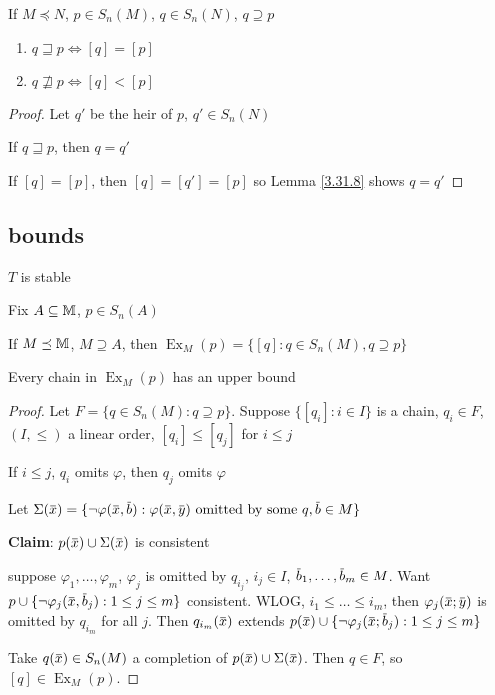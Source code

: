 \documentclass[11pt]{article}
\DeclareMathOperator{\Ex}{Ex}
\begin{document}
\begin{proposition}[]
\label{3.31.9}
If \(M\preceq N\), \(p\in S_n(M)\), \(q\in S_n(N)\), \(q\supseteq p\)
\begin{enumerate}
\item \(q\sqsupseteq p\Leftrightarrow[q]=[p]\)
\item \(q\not\sqsupseteq p\Leftrightarrow[q]<[p]\)
\end{enumerate}
\end{proposition}

\begin{proof}
Let \(q'\) be the heir of \(p\), \(q'\in S_n(N)\)

If \(q\sqsupseteq p\), then \(q=q'\)

If \([q]=[p]\), then \([q]=[q']=[p]\) so Lemma \ref{3.31.8} shows \(q=q'\)
\end{proof}
\subsection{bounds}
\label{sec:orgdd4dde4}
\(T\) is stable

Fix \(A\subseteq\mathbb{M}\), \(p\in S_n(A)\)

\begin{definition}[]
If \(M\preceq\mathbb{M}\), \(M\supseteq A\), then \(\Ex_M(p)=\{[q]:q\in S_n(M), q\supseteq p\}\)
\end{definition}

\begin{lemma}[]
\label{3.31.11}
Every chain in \(\Ex_M(p)\) has an upper bound
\end{lemma}

\begin{proof}
Let \(F=\{q\in S_n(M):q\supseteq p\}\). Suppose \(\{[q_i]:i\in I\}\) is a chain, \(q_i\in F\), \((I,\le)\) a linear
order, \([q_i]\le[q_j]\) for \(i\le j\)

If \(i\le j\), \(q_i\) omits \(\varphi\), then \(q_j\) omits \(\varphi\)

Let \(\Sigma(\barx)=\{\neg\varphi(\barx,\barb):\varphi(\barx,\bary)\text{ omitted by some }q, \barb\in M\}\)

\textbf{Claim}: \(p(\barx)\cup\Sigma(\barx)\) is consistent

suppose \(\varphi_1,\dots,\varphi_m\), \(\varphi_j\) is omitted by \(q_{i_j}\), \(i_j\in I\), \(\barb_1,\dots,\barb_m\in M\).
Want \(p\cup\{\neg\varphi_j(\barx,\barb_j):1\le j\le m\}\) consistent. WLOG, \(i_1\le\dots\le i_m\),
then \(\varphi_j(\barx;\bary)\) is omitted by \(q_{i_m}\) for all \(j\). Then \(q_{i_m}(\barx)\)
extends \(p(\barx)\cup\{\neg\varphi_j(\barx;\barb_j):1\le j\le m\}\)

Take \(q(\barx)\in S_n(M)\) a completion of \(p(\barx)\cup\Sigma(\barx)\). Then \(q\in F\),
so \([q]\in\Ex_M(p)\).
\end{proof}
\end{document}
